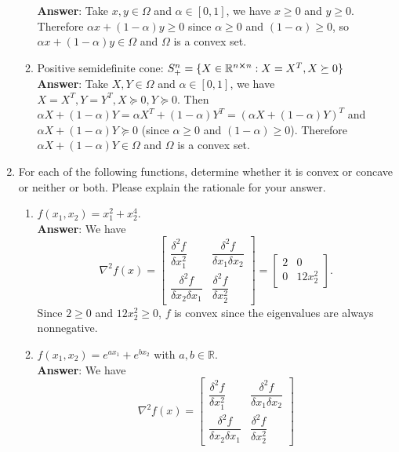 \documentclass{article}
\begin{document}
\begin{enumerate}
\begin{enumerate}
                        \textbf{Answer}: Take $x,y\in\Omega$ and $\alpha\in[0,1]$, we have $x\geq 0$ and $y\geq 0$. Therefore $\alpha x+(1-\alpha)y\geq 0$ since $\alpha\geq 0$ and $(1-\alpha)\geq 0$, so $\alpha x+(1-\alpha)y\in\Omega$ and $\Omega$ is a convex set.
                  \item Positive semidefinite cone: $S_+^n=\{X\in\mathbb{R}^{n\cross n}:X=X^T,X\succeq 0\}$\\
                        \textbf{Answer}: Take $X,Y\in\Omega$ and $\alpha\in[0,1]$, we have $X=X^T,Y=Y^T,X\succeq 0,Y\succeq 0$. Then $\alpha X+(1-\alpha)Y=\alpha X^T+(1-\alpha)Y^T=(\alpha X+(1-\alpha)Y)^T$ and $\alpha X+(1-\alpha)Y\succeq 0$ (since $\alpha\geq 0$ and $(1-\alpha)\geq 0$). Therefore $\alpha X+(1-\alpha)Y\in\Omega$ and $\Omega$ is a convex set.
            \end{enumerate}
      \item For each of the following functions, determine whether it is convex or concave or neither or both. Please explain the rationale for your answer.
            \begin{enumerate}
                  \item $f(x_1,x_2)=x_1^2+x_2^4$.\\
                        \textbf{Answer}: We have \[
                              \nabla^2 f(x)=\begin{bmatrix}
                                    \dfrac{\delta^2 f}{\delta x_1^2} & \dfrac{\delta^2 f}{\delta x_1\delta x_2} \\\dfrac{\delta^2 f}{\delta x_2\delta x_1}&\dfrac{\delta^2 f}{\delta x_2^2}
                              \end{bmatrix}=\begin{bmatrix}
                                    2 & 0       \\
                                    0 & 12x_2^2
                              \end{bmatrix}.
                        \] Since $2\geq 0$ and $12x_2^2\geq 0$, $f$ is convex since the eigenvalues are always nonnegative.
                  \item $f(x_1,x_2)=e^{ax_1}+e^{bx_2}$ with $a,b\in\mathbb{R}$.\\
                        \textbf{Answer}: We have \[
                              \nabla^2 f(x)=\begin{bmatrix}
                                    \dfrac{\delta^2 f}{\delta x_1^2} & \dfrac{\delta^2 f}{\delta x_1\delta x_2} \\\dfrac{\delta^2 f}{\delta x_2\delta x_1}&\dfrac{\delta^2 f}{\delta x_2^2}

\end{bmatrix}\]
\end{enumerate}
\end{enumerate}
\end{document}
